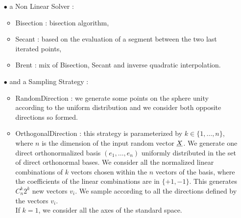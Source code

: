 {\begin{itemize}
\begin{itemize}
    \item SafeAndSlow : for each direction, we go along the direction by step of length {\itshape stepSize} from the origin to the maximum distant point(at distance {\itshape MaximumDistance} from the center of the standard space) and we check whether there is a sign changement on each segment so formed.\\
      We go until the maximum distant point.  Then, for all the segments where we detected the presence of a root, we research the root with the selected non linear solver. We evaluate the contribution to the failure probability of each segment. \\
      If {\itshape stepSize} is small enough, this strategy garantees us to find all the roots in the direction and the contribution of this direction to the failure probability is precisely evaluated.
    \end{itemize}

  \item[$\bullet$] a Non Linear Solver :
    \begin{itemize}
    \item Bisection : bisection algorithm,
    \item Secant : based on the evaluation of a segment between the two last iterated points,
    \item Brent : mix of Bisection, Secant and inverse quadratic interpolation.
    \end{itemize}
  \item[$\bullet$] and a Sampling Strategy :
    \begin{itemize}
    \item RandomDirection : we generate some points on the sphere unity according to the uniform distribution and we consider both opposite directions so formed.
    \item OrthogonalDirection : this strategy is parameterized by $k\in \{1,\dots,n\}$, where $n$ is the dimension of the input random vector ${\underline{X}}$. We generate one direct orthonormalized basis $(e_1, \dots, e_n)$ uniformly distributed in the set of direct orthonormal bases. We consider all the normalized linear combinations of $k$ vectors chosen within the $n$ vectors of the basis, where the coefficients of the linear combinations are in $\{+1, -1\}$. This generates $C_n^k 2^k$ new vectors $v_i$. We sample according to all the directions defined by the vectors $v_i$.\\
      If $k=1$, we consider all the axes of the standard space.
    \end{itemize}
  \end{itemize}
}
{
}

